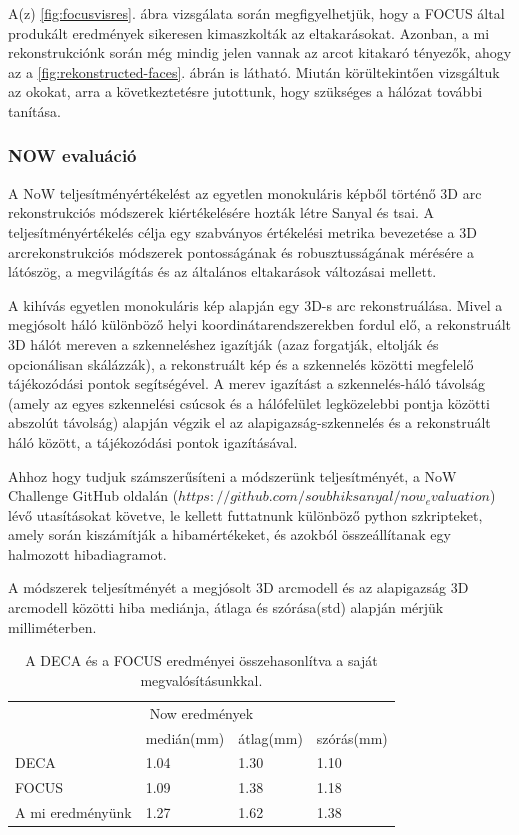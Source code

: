 \documentclass[12pt,a4]{article}
\begin{document}
            A(z) \ref{fig:focusvisres}. ábra vizsgálata során megfigyelhetjük, hogy a FOCUS által produkált eredmények sikeresen kimaszkolták az eltakarásokat. Azonban, a mi rekonstrukciónk során még mindig jelen vannak az arcot kitakaró tényezők, ahogy az a \ref{fig:rekonstructed-faces}. ábrán is látható. Miután körültekintően vizsgáltuk az okokat, arra a következtetésre jutottunk, hogy szükséges a hálózat további tanítása.
            
            \clearpage
            \subsubsection{NOW evaluáció}

            A NoW teljesítményértékelést az egyetlen monokuláris képből történő 3D arc rekonstrukciós módszerek kiértékelésére hozták létre Sanyal és tsai. \cite{now} A teljesítményértékelés célja egy szabványos értékelési metrika bevezetése a 3D arcrekonstrukciós módszerek pontosságának és robusztusságának mérésére a látószög, a megvilágítás és az általános eltakarások változásai mellett.

            A kihívás egyetlen monokuláris kép alapján egy 3D-s arc rekonstruálása. Mivel a megjósolt háló különböző helyi koordinátarendszerekben fordul elő, a rekonstruált 3D hálót mereven a szkenneléshez igazítják (azaz forgatják, eltolják és opcionálisan skálázzák), a rekonstruált kép és a szkennelés közötti megfelelő tájékozódási pontok segítségével. A merev igazítást a szkennelés-háló távolság (amely az egyes szkennelési csúcsok és a hálófelület legközelebbi pontja közötti abszolút távolság) alapján végzik el az alapigazság-szkennelés és a rekonstruált háló között, a tájékozódási pontok igazításával.

            Ahhoz hogy tudjuk számszerűsíteni a módszerünk teljesítményét, a NoW Challenge GitHub oldalán ($https://github.com/soubhiksanyal/now_evaluation$) lévő utasításokat követve, le kellett futtatnunk különböző python szkripteket, amely során kiszámítják a hibamértékeket, és azokból összeállítanak egy halmozott hibadiagramot.
            
            A módszerek teljesítményét a megjósolt 3D arcmodell és az alapigazság 3D arcmodell közötti hiba mediánja, átlaga és szórása(std) alapján mérjük milliméterben. 
            
            \begin{table}[htb]\centering
            \begin{tabular}{llll}
            \multicolumn{4}{c}{Now eredmények}                 \\
                             & medián(mm) & átlag(mm) & szórás(mm) \\
            DECA             & 1.04       & 1.30     & 1.10    \\
            FOCUS            & 1.09       & 1.38     & 1.18    \\
            A mi eredményünk & 1.27       & 1.62     & 1.38   
            \end{tabular}
            \caption{A DECA és a FOCUS eredményei összehasonlítva a saját megvalósításunkkal.}
            \end{table}
\end{document}
